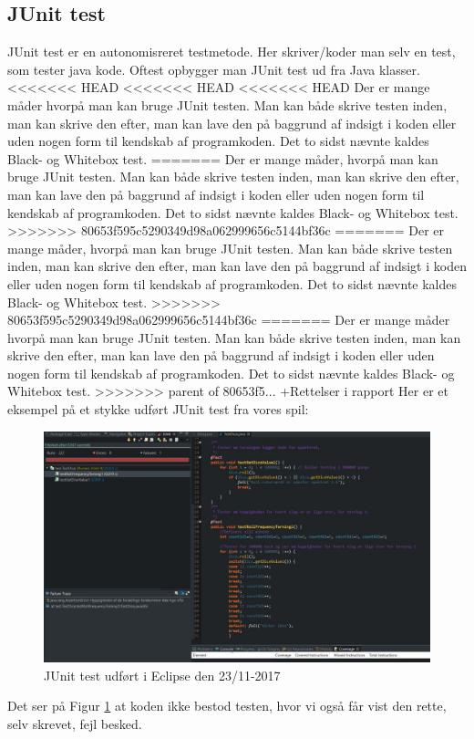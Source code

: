     \subsection{JUnit test}
        JUnit test er en autonomisreret testmetode. Her skriver/koder man selv en test, som tester java kode. Oftest opbygger man JUnit test ud fra Java klasser.
<<<<<<< HEAD
<<<<<<< HEAD
<<<<<<< HEAD
        Der er mange måder hvorpå man kan bruge JUnit testen. Man kan både skrive testen inden, man kan skrive den efter, man kan lave den på baggrund af indsigt i koden eller uden nogen form til kendskab af programkoden. Det to sidst nævnte kaldes Black- og Whitebox test.
=======
        Der er mange måder, hvorpå man kan bruge JUnit testen. Man kan både skrive testen inden, man kan skrive den efter, man kan lave den på baggrund af indsigt i koden eller uden nogen form til kendskab af programkoden. Det to sidst nævnte kaldes Black- og Whitebox test.
>>>>>>> 80653f595c5290349d98a062999656c5144bf36c
=======
        Der er mange måder, hvorpå man kan bruge JUnit testen. Man kan både skrive testen inden, man kan skrive den efter, man kan lave den på baggrund af indsigt i koden eller uden nogen form til kendskab af programkoden. Det to sidst nævnte kaldes Black- og Whitebox test.
>>>>>>> 80653f595c5290349d98a062999656c5144bf36c
=======
        Der er mange måder hvorpå man kan bruge JUnit testen. Man kan både skrive testen inden, man kan skrive den efter, man kan lave den på baggrund af indsigt i koden eller uden nogen form til kendskab af programkoden. Det to sidst nævnte kaldes Black- og Whitebox test.
>>>>>>> parent of 80653f5... +Rettelser i rapport
        Her er et eksempel på et stykke udført JUnit test fra vores spil:
            \begin{figure}[h]\label{fig:JUnitTest} %
                \advance\leftskip-3cm
                \includegraphics[width=20cm]{fig/JUnitTestDice.jpg}
                \caption{JUnit test udført i Eclipse den 23/11-2017}
            \end{figure}
        Det ser på Figur \ref{fig:JUnitTest} at koden ikke bestod testen, hvor vi også får vist den rette, selv skrevet, fejl besked.

